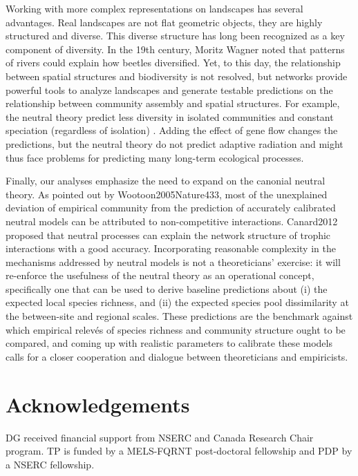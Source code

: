 \documentclass[12pt]{article}
\begin{document}
Working with more complex representations on landscapes has several
advantages. Real landscapes are not flat geometric objects, they are highly
structured and diverse. This diverse structure has long been recognized as
a key component of diversity. In the 19th century, Moritz Wagner noted that patterns of rivers \cite{coy04} could explain how beetles diversified. Yet, to this day, the relationship between spatial structures and biodiversity is not resolved, but networks provide powerful tools to analyze landscapes and generate
testable predictions on the relationship between community assembly
and spatial structures. For example, the neutral theory predict less diversity
in isolated communities and constant speciation (regardless of isolation) \cite{eco08}. Adding the effect of gene flow changes the predictions, but
the neutral theory do not predict adaptive radiation and might thus face
problems for predicting many long-term ecological processes.


Finally, our analyses emphasize the need to expand on the canonial neutral
theory. As pointed out by Wootoon2005Nature433, most of the unexplained
deviation of empirical community from the prediction of accurately calibrated
neutral models can be attributed to non-competitive interactions. Canard2012
proposed that neutral processes can explain the network structure of trophic
interactions with a good accuracy. Incorporating reasonable complexity in the
mechanisms addressed by neutral models is not a theoreticians' exercise: it will
re-enforce the usefulness of the neutral theory as an operational concept,
specifically one that can be used to derive baseline predictions about (i) the
expected local species richness, and (ii) the expected species pool
dissimilarity at the between-site and regional scales. These predictions are the
benchmark against which empirical relev\'es of species richness and community
structure ought to be compared, and coming up with realistic parameters to
calibrate these models calls for a closer cooperation and dialogue between
theoreticians and empiricists.


\section{Acknowledgements}
DG received financial support from NSERC and Canada Research Chair program. TP
is funded by a MELS-FQRNT post-doctoral fellowship and PDP by a NSERC
fellowship.
\newpage
\end{document}
